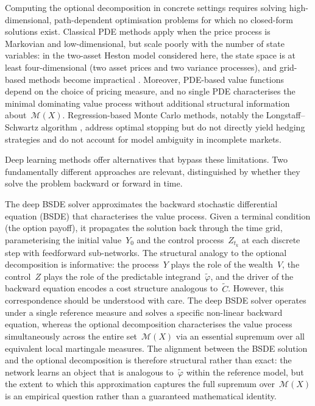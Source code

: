 Computing the optional decomposition in concrete settings requires solving
high-dimensional, path-dependent optimisation problems for which no
closed-form solutions exist.  Classical PDE methods apply when the price
process is Markovian and low-dimensional, but scale poorly with the number
of state variables: in the two-asset Heston model considered here, the
state space is at least four-dimensional (two asset prices and two
variance processes), and grid-based methods become impractical
\citep{Glasserman2003}.  Moreover, PDE-based value functions depend on the
choice of pricing measure, and no single PDE characterises the minimal
dominating value process without additional structural information
about~$\mathcal{M}(X)$.  Regression-based Monte Carlo methods, notably the
Longstaff--Schwartz algorithm \citep{LongstaffSchwartz2001}, address
optimal stopping but do not directly yield hedging strategies and do not
account for model ambiguity in incomplete markets.

Deep learning methods offer alternatives that bypass these limitations.
Two fundamentally different approaches are relevant, distinguished by
whether they solve the problem backward or forward in time.

The deep BSDE solver \citep{HanJentzenE2018} approximates the backward
stochastic differential equation (BSDE) that characterises the value
process.  Given a terminal condition (the option payoff), it propagates the
solution back through the time grid, parameterising the initial
value~$Y_0$ and the control process~$Z_{t_k}$ at each discrete step with
feedforward sub-networks.  The structural analogy to the optional
decomposition is informative: the process~$Y$ plays the role of the
wealth~$V$, the control~$Z$ plays the role of the predictable
integrand~$\tilde{\varphi}$, and the driver of the backward equation
encodes a cost structure analogous to~$\tilde{C}$.  However, this
correspondence should be understood with care.  The deep BSDE solver
operates under a single reference measure and solves a specific non-linear
backward equation, whereas the optional decomposition characterises the
value process simultaneously across the entire
set~$\mathcal{M}(X)$ via an essential supremum over all equivalent local
martingale measures.  The alignment between the BSDE solution and the
optional decomposition is therefore structural rather than exact: the
network learns an object that is analogous to~$\tilde{\varphi}$ within the
reference model, but the extent to which this approximation captures the
full supremum over~$\mathcal{M}(X)$ is an empirical question rather than a
guaranteed mathematical identity.

